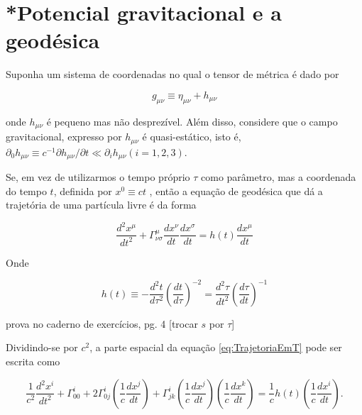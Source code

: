 \section{*Potencial gravitacional e a geodésica}\label{sec:PotencialGravitacionalGeodesica}

Suponha um sistema de coordenadas no qual o tensor de métrica é dado por

\begin{equation}\label{eq:TensorMetricaLocal}
g_{\mu \nu} \equiv \eta_{\mu \nu}+h_{\mu \nu}
\end{equation}

onde $ h_{\mu \nu} $ é pequeno mas não desprezível. Além disso, considere que o campo gravitacional, expresso por $ h_{\mu\nu} $ é quasi-estático, isto é, $ \partial_{0} h_{\mu \nu} \equiv c^{-1} \partial h_{\mu \nu} / \partial t \ll \partial_{i} h_{\mu \nu} (i=1,2,3) $.

Se, em vez de utilizarmos o tempo próprio $ \tau $ como parâmetro, mas a coordenada do tempo $ t $, definida por {\color{blue}$ x^0 \equiv ct $} %
, então a equação de geodésica que dá a trajetória de uma partícula livre é da forma

\begin{equation}\label{eq:TrajetoriaEmT}
\frac{d^{2} x^{\mu}}{d t^{2}}+\Gamma_{\nu \sigma}^{\mu} \frac{d x^{\nu}}{d t} \frac{d x^{\sigma}}{d t}=h(t) \frac{d x^{\mu}}{d t}
\end{equation}

Onde

\begin{equation}\label{eq:HDefinicao}
h(t) \equiv-\frac{d^{2} t}{d \tau^{2}}\left(\frac{d t}{d \tau}\right)^{-2}=\frac{d^{2} \tau}{d t^{2}}\left(\frac{d \tau}{d t}\right)^{-1}
\end{equation}

{\color{red} prova no caderno de exercícios, pg. 4 [trocar $ s $ por $ \tau $]}

Dividindo-se por $ c^2 $, a parte espacial da equação \ref{eq:TrajetoriaEmT} pode ser escrita como

\begin{equation}\label{eq:TrajetoriaParteEspacial}
\frac{1}{c^{2}} \frac{d^{2} x^{i}}{d t^{2}}+\Gamma_{00}^{i}+2 \Gamma_{0 j}^{i}\left(\frac{1}{c} \frac{d x^{j}}{d t}\right)+\Gamma_{j k}^{i}\left(\frac{1}{c} \frac{d x^{j}}{d t}\right)\left(\frac{1}{c} \frac{d x^{k}}{d t}\right)=\frac{1}{c} h(t)\left(\frac{1}{c} \frac{d x^{i}}{d t}\right).
\end{equation}


